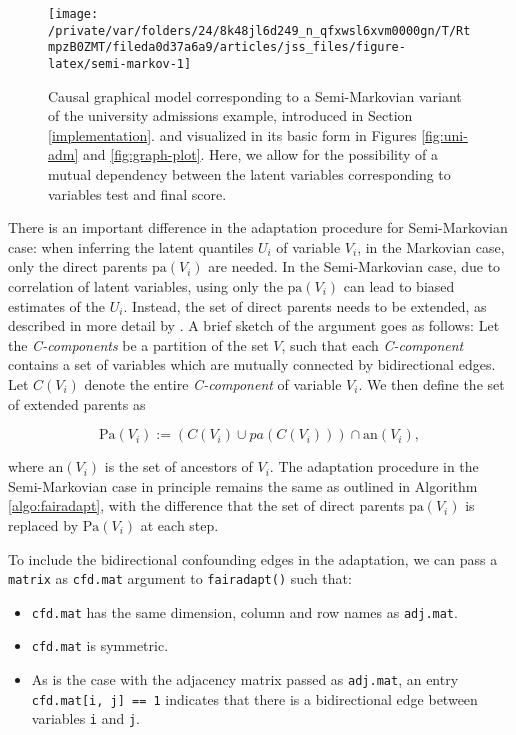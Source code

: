 \documentclass[
  nojss]{jss}
\providecommand{\tightlist}{%
  \setlength{\itemsep}{0pt}\setlength{\parskip}{0pt}}
\begin{document}
\begin{CodeChunk}
\begin{figure}

{\centering \texttt{[image: /private/var/folders/24/8k48jl6d249\_n\_qfxwsl6xvm0000gn/T/RtmpzB0ZMT/fileda0d37a6a9/articles/jss\_files/figure-latex/semi-markov-1]} 

}

\caption{Causal graphical model corresponding to a Semi-Markovian variant of the university admissions example, introduced in Section \ref{implementation}.  and visualized in its basic form in Figures \ref{fig:uni-adm} and \ref{fig:graph-plot}. Here, we allow for the possibility of a mutual dependency between the latent variables corresponding to variables test and final score.}\label{fig:semi-markov}
\end{figure}
\end{CodeChunk}

There is an important difference in the adaptation procedure for
Semi-Markovian case: when inferring the latent quantiles \(U_i\) of
variable \(V_i\), in the Markovian case, only the direct parents
\(\mathrm{pa}(V_i)\) are needed. In the Semi-Markovian case, due to
correlation of latent variables, using only the \(\mathrm{pa}(V_i)\) can
lead to biased estimates of the \(U_i\). Instead, the set of direct
parents needs to be extended, as described in more detail by
\citet{tian2002general}. A brief sketch of the argument goes as follows:
Let the \emph{C-components} be a partition of the set \(V\), such that
each \emph{C-component} contains a set of variables which are mutually
connected by bidirectional edges. Let \(C(V_i)\) denote the entire
\emph{C-component} of variable \(V_i\). We then define the set of
extended parents as

\[\mathrm{Pa}(V_i) := (C(V_i) \cup pa(C(V_i))) \cap \mathrm{an}(V_i),\]

where \(\mathrm{an}(V_i)\) is the set of ancestors of \(V_i\). The
adaptation procedure in the Semi-Markovian case in principle remains the
same as outlined in Algorithm \ref{algo:fairadapt}, with the difference
that the set of direct parents \(\mathrm{pa}(V_i)\) is replaced by
\(\mathrm{Pa}(V_i)\) at each step.

To include the bidirectional confounding edges in the adaptation, we can
pass a \texttt{matrix} as \texttt{cfd.mat} argument to
\texttt{fairadapt()} such that:

\begin{itemize}
\tightlist
\item
  \texttt{cfd.mat} has the same dimension, column and row names as
  \texttt{adj.mat}.
\item
  \texttt{cfd.mat} is symmetric.
\item
  As is the case with the adjacency matrix passed as \texttt{adj.mat},
  an entry \texttt{cfd.mat{[}i,\ j{]}\ ==\ 1} indicates that there is a
  bidirectional edge between variables \texttt{i} and \texttt{j}.
\end{itemize}
\end{document}
